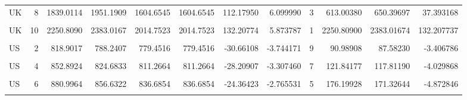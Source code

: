 \begin{table}
\begin{tabular}[t]{lrrrrrrrrrrr}
UK & 8 & 1839.0114 & 1951.1909 & 1604.6545 & 1604.6545 & 112.17950 & 6.099990 & 3 & 613.00380 & 650.39697 & 37.393168\\
\cellcolor{gray!10}{UK} & \cellcolor{gray!10}{9} & \cellcolor{gray!10}{2035.4076} & \cellcolor{gray!10}{2182.5672} & \cellcolor{gray!10}{1796.8807} & \cellcolor{gray!10}{1796.8807} & \cellcolor{gray!10}{147.15952} & \cellcolor{gray!10}{7.229978} & \cellcolor{gray!10}{2} & \cellcolor{gray!10}{1017.70382} & \cellcolor{gray!10}{1091.28358} & \cellcolor{gray!10}{73.579760}\\
UK & 10 & 2250.8090 & 2383.0167 & 2014.7523 & 2014.7523 & 132.20774 & 5.873787 & 1 & 2250.80900 & 2383.01674 & 132.207737\\
\addlinespace
\cellcolor{gray!10}{US} & \cellcolor{gray!10}{1} & \cellcolor{gray!10}{766.9808} & \cellcolor{gray!10}{738.7728} & \cellcolor{gray!10}{727.9712} & \cellcolor{gray!10}{727.9712} & \cellcolor{gray!10}{-28.20801} & \cellcolor{gray!10}{-3.677799} & \cellcolor{gray!10}{10} & \cellcolor{gray!10}{76.69808} & \cellcolor{gray!10}{73.87728} & \cellcolor{gray!10}{-2.820801}\\
US & 2 & 818.9017 & 788.2407 & 779.4516 & 779.4516 & -30.66108 & -3.744171 & 9 & 90.98908 & 87.58230 & -3.406786\\
\cellcolor{gray!10}{US} & \cellcolor{gray!10}{3} & \cellcolor{gray!10}{854.8408} & \cellcolor{gray!10}{826.0714} & \cellcolor{gray!10}{812.4877} & \cellcolor{gray!10}{812.4877} & \cellcolor{gray!10}{-28.76942} & \cellcolor{gray!10}{-3.365471} & \cellcolor{gray!10}{8} & \cellcolor{gray!10}{106.85510} & \cellcolor{gray!10}{103.25892} & \cellcolor{gray!10}{-3.596178}\\
US & 4 & 852.8924 & 824.6833 & 811.2664 & 811.2664 & -28.20907 & -3.307460 & 7 & 121.84177 & 117.81190 & -4.029868\\
\cellcolor{gray!10}{US} & \cellcolor{gray!10}{5} & \cellcolor{gray!10}{836.0756} & \cellcolor{gray!10}{814.1671} & \cellcolor{gray!10}{789.9692} & \cellcolor{gray!10}{789.9692} & \cellcolor{gray!10}{-21.90853} & \cellcolor{gray!10}{-2.620401} & \cellcolor{gray!10}{6} & \cellcolor{gray!10}{139.34593} & \cellcolor{gray!10}{135.69451} & \cellcolor{gray!10}{-3.651422}\\
\addlinespace
US & 6 & 880.9964 & 856.6322 & 836.6854 & 836.6854 & -24.36423 & -2.765531 & 5 & 176.19928 & 171.32644 & -4.872846\\
\cellcolor{gray!10}{US} & \cellcolor{gray!10}{7} & \cellcolor{gray!10}{917.7895} & \cellcolor{gray!10}{898.4618} & \cellcolor{gray!10}{873.1006} & \cellcolor{gray!10}{873.1006} & \cellcolor{gray!10}{-19.32770} & \cellcolor{gray!10}{-2.105897} & \cellcolor{gray!10}{4} & \cellcolor{gray!10}{229.44738} & \cellcolor{gray!10}{224.61546} & \cellcolor{gray!10}{-4.831926}\\

\end{tabular}
\end{table}
